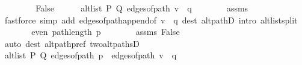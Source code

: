 \begin{isabellebody}
\ \ \isamarkupfalse%
\isanewline
\ \ \ \ \isamarkupfalse%
\ False\isanewline
\ \ \ \ \isamarkupfalse%
\ {\isachardoublequoteopen}alt{\isacharunderscore}{\kern0pt}list\ P\ Q\ {\isacharparenleft}{\kern0pt}edges{\isacharunderscore}{\kern0pt}of{\isacharunderscore}{\kern0pt}path\ {\isacharparenleft}{\kern0pt}v\ {\isacharhash}{\kern0pt}\ q{\isacharparenright}{\kern0pt}{\isacharparenright}{\kern0pt}{\isachardoublequoteclose}\isanewline
\ \ \ \ \ \ \isamarkupfalse%
\ assms{\isacharparenleft}{\kern0pt}{}{\isacharparenright}{\kern0pt}\isanewline
\ \ \ \ \ \ \isamarkupfalse%
\ {\isacharparenleft}{\kern0pt}fastforce\ simp\ add{\isacharcolon}{\kern0pt}\ edges{\isacharunderscore}{\kern0pt}of{\isacharunderscore}{\kern0pt}path{\isacharunderscore}{\kern0pt}append{\isacharunderscore}{\kern0pt}{}{\isacharbrackleft}{\kern0pt}of\ {\isachardoublequoteopen}v\ {\isacharhash}{\kern0pt}\ q{\isachardoublequoteclose}{\isacharbrackright}{\kern0pt}\ dest{\isacharcolon}{\kern0pt}\ alt{\isacharunderscore}{\kern0pt}pathD{\isacharparenleft}{\kern0pt}{}{\isacharparenright}{\kern0pt}\ intro{\isacharcolon}{\kern0pt}\ alt{\isacharunderscore}{\kern0pt}list{\isacharunderscore}{\kern0pt}split{\isacharunderscore}{\kern0pt}{}{\isacharparenright}{\kern0pt}\isanewline
\ \ \ \ \isamarkupfalse%
\ \isamarkupfalse%
\ {\isachardoublequoteopen}even\ {\isacharparenleft}{\kern0pt}path{\isacharunderscore}{\kern0pt}length\ p{\isacharprime}{\kern0pt}{\isacharparenright}{\kern0pt}{\isachardoublequoteclose}\isanewline
\ \ \ \ \ \ \isamarkupfalse%
\ assms\ False\isanewline
\ \ \ \ \ \ \isamarkupfalse%
\ {\isacharparenleft}{\kern0pt}auto\ dest{\isacharcolon}{\kern0pt}\ alt{\isacharunderscore}{\kern0pt}path{\isacharunderscore}{\kern0pt}pref\ two{\isacharunderscore}{\kern0pt}alt{\isacharunderscore}{\kern0pt}pathsD{\isacharparenright}{\kern0pt}\isanewline
\ \ \ \ \isamarkupfalse%
\ \isamarkupfalse%
\ {\isachardoublequoteopen}alt{\isacharunderscore}{\kern0pt}list\ P\ Q\ {\isacharparenleft}{\kern0pt}edges{\isacharunderscore}{\kern0pt}of{\isacharunderscore}{\kern0pt}path\ p{\isacharprime}{\kern0pt}\ {\isacharat}{\kern0pt}\ edges{\isacharunderscore}{\kern0pt}of{\isacharunderscore}{\kern0pt}path\ {\isacharparenleft}{\kern0pt}v\ {\isacharhash}{\kern0pt}\ q{\isacharparenright}{\kern0pt}{\isacharparenright}{\kern0pt}{\isachardoublequoteclose}\isanewline
\ \ \ \ \ \ \isamarkupfalse%

\end{isabellebody}
